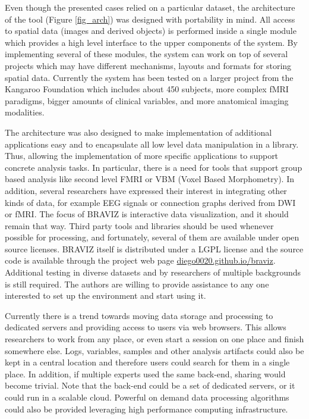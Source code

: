 \documentclass[twocolumn]{svjour3}
\begin{document}
Even though the presented cases relied on a particular dataset, the architecture of the tool (Figure \ref{fig_arch}) was designed with portability in mind. All access to spatial data (images and derived objects) is performed inside a single module which provides a high level interface to the upper components of the system. By implementing several of these modules, the system can work on top of several projects which may have different mechanisms, layouts and formats for storing spatial data. Currently the system has been tested on a larger project from the Kangaroo Foundation which includes about 450 subjects, more complex fMRI paradigms, bigger amounts of clinical variables, and more anatomical imaging modalities.  

The architecture was also designed to make implementation of additional applications easy and to encapsulate all low level data manipulation in a library. Thus, allowing the implementation of more specific applications to support concrete analysis tasks. In particular, there is a need for tools that support group based analysis like second level FMRI or VBM (Voxel Based Morphometry). In addition, several researchers have expressed their interest in integrating other kinds of data, for example EEG signals or connection graphs \cite{rubinov_complex_2010} derived from DWI or fMRI.  
The focus of BRAVIZ is interactive data visualization, and it should remain that way. Third party tools and libraries should be used whenever possible for processing, and fortunately, several of them are available under open source licenses. BRAVIZ itself is distributed under a LGPL license and the source code is available through the project web page \url{diego0020.github.io/braviz}. Additional testing in diverse datasets and by researchers of multiple backgrounds is still required. The authors are willing to provide assistance to any one interested to set up the environment and start using it. 
  
Currently there is a trend towards moving data storage and processing to dedicated servers and providing access to users via web browsers. This allows researchers to work from any place, or even start a session on one place and finish somewhere else. Logs, variables, samples and other analysis artifacts could also be kept in a central location and therefore users could search for them in a single place. In addition, if multiple experts used the same back-end, sharing would become trivial. Note that the back-end could be a set of dedicated servers, or it could run in a scalable cloud. Powerful on demand data processing algorithms could also be provided leveraging high performance computing infrastructure. 
\end{document}
